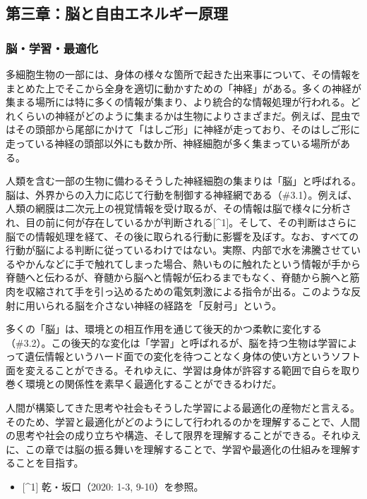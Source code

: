 \subsection{第三章：脳と自由エネルギー原理}\label{ux7b2cux4e09ux7ae0ux8133ux3068ux81eaux7531ux30a8ux30cdux30ebux30aeux30fcux539fux7406}

\subsubsection{脳・学習・最適化}\label{ux8133ux5b66ux7fd2ux6700ux9069ux5316}

多細胞生物の一部には、身体の様々な箇所で起きた出来事について、その情報をまとめた上でそこから全身を適切に動かすための「神経」がある。多くの神経が集まる場所には特に多くの情報が集まり、より統合的な情報処理が行われる。どれくらいの神経がどのように集まるかは生物によりさまざまだ。例えば、昆虫ではその頭部から尾部にかけて「はしご形」に神経が走っており、そのはしご形に走っている神経の頭部以外にも数か所、神経細胞が多く集まっている場所がある。

人類を含む一部の生物に備わるそうした神経細胞の集まりは「脳」と呼ばれる。脳は、外界からの入力に応じて行動を制御する神経網である（\#3.1）。例えば、人類の網膜は二次元上の視覚情報を受け取るが、その情報は脳で様々に分析され、目の前に何が存在しているかが判断される{[}\^{}1{]}。そして、その判断はさらに脳での情報処理を経て、その後に取られる行動に影響を及ぼす。なお、すべての行動が脳による判断に従っているわけではない。実際、内部で水を沸騰させているやかんなどに手で触れてしまった場合、熱いものに触れたという情報が手から脊髄へと伝わるが、脊髄から脳へと情報が伝わるまでもなく、脊髄から腕へと筋肉を収縮されて手を引っ込めるための電気刺激による指令が出る。このような反射に用いられる脳を介さない神経の経路を「反射弓」という。

多くの「脳」は、環境との相互作用を通じて後天的かつ柔軟に変化する（\#3.2）。この後天的な変化は「学習」と呼ばれるが、脳を持つ生物は学習によって遺伝情報というハード面での変化を待つことなく身体の使い方というソフト面を変えることができる。それゆえに、学習は身体が許容する範囲で自らを取り巻く環境との関係性を素早く最適化することができるわけだ。

人間が構築してきた思考や社会もそうした学習による最適化の産物だと言える。そのため、学習と最適化がどのようにして行われるのかを理解することで、人間の思考や社会の成り立ちや構造、そして限界を理解することができる。それゆえに、この章では脳の振る舞いを理解することで、学習や最適化の仕組みを理解することを目指す。

\begin{itemize}
\tightlist
\item
  {[}\^{}1{]} 乾・坂口（2020: 1-3, 9-10）を参照。
\end{itemize}

